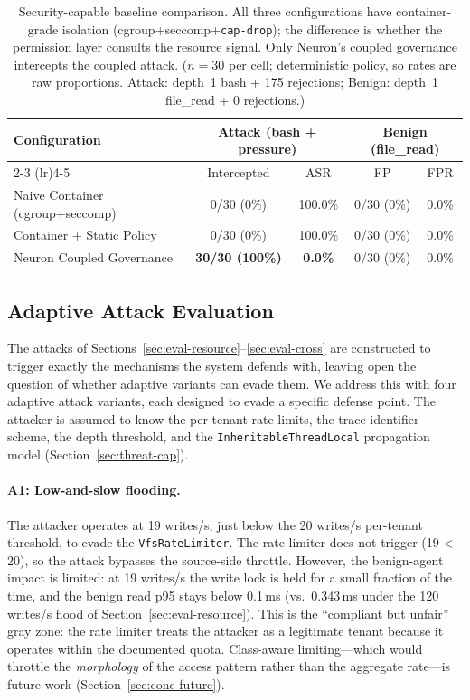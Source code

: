 \begin{table}[t]
\centering
\caption{Security-capable baseline comparison. All three configurations
have container-grade isolation (cgroup+seccomp+\texttt{cap-drop}); the
difference is whether the permission layer consults the resource signal.
Only Neuron's coupled governance intercepts the coupled attack.
($n=30$ per cell; deterministic policy, so rates are raw proportions.
Attack: depth~1 bash + 175 rejections; Benign: depth~1 file\_read + 0
rejections.)}
\label{tab:security-baseline}
\begin{tabular}{lcccc}
\toprule
Configuration & \multicolumn{2}{c}{Attack (bash + pressure)} & \multicolumn{2}{c}{Benign (file\_read)} \\
\cmidrule(lr){2-3} \cmidrule(lr){4-5}
 & Intercepted & ASR & FP & FPR \\
\midrule
Naive Container (cgroup+seccomp)    & 0/30 (0\%)   & 100.0\% & 0/30 (0\%) & 0.0\% \\
Container + Static Policy           & 0/30 (0\%)   & 100.0\% & 0/30 (0\%) & 0.0\% \\
Neuron Coupled Governance           & \textbf{30/30 (100\%)} & \textbf{0.0\%} & 0/30 (0\%) & 0.0\% \\
\bottomrule
\end{tabular}
\end{table}

\subsection{Adaptive Attack Evaluation}
\label{sec:eval-adaptive}

The attacks of Sections~\ref{sec:eval-resource}--\ref{sec:eval-cross}
are constructed to trigger exactly the mechanisms the system defends
with, leaving open the question of whether adaptive variants can
evade them. We address this with four adaptive attack variants, each
designed to evade a specific defense point. The attacker is assumed
to know the per-tenant rate limits, the trace-identifier scheme, the
depth threshold, and the \texttt{InheritableThreadLocal} propagation
model
(Section~\ref{sec:threat-cap}).

\paragraph{A1: Low-and-slow flooding.}
The attacker operates at 19 writes/s, just below the 20 writes/s
per-tenant threshold, to evade the \texttt{VfsRateLimiter}. The
rate limiter does not trigger (19 < 20), so the attack bypasses
the source-side throttle. However, the benign-agent impact is
limited: at 19 writes/s the write lock is held for a small fraction
of the time, and the benign read p95 stays below 0.1\,ms (vs.\
0.343\,ms under the 120\,writes/s flood of
Section~\ref{sec:eval-resource}). This is the ``compliant but
unfair'' gray zone: the rate limiter treats the attacker as a
legitimate tenant because it operates within the documented quota.
Class-aware limiting---which would throttle the \emph{morphology}
of the access pattern rather than the aggregate rate---is future
work (Section~\ref{sec:conc-future}).

